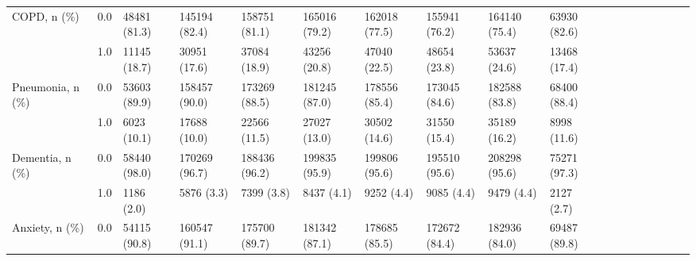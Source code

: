 \begin{tabular}{llllllllllllllllll}
COPD, n (\%) & 0.0 &                 48481 (81.3) &   145194 (82.4) &   158751 (81.1) &   165016 (79.2) &   162018 (77.5) &   155941 (76.2) &   164140 (75.4) &   63930 (82.6) &                   &                    &                    &                    &                    &                     &                     &                     \\
                                       & 1.0 &                 11145 (18.7) &    30951 (17.6) &    37084 (18.9) &    43256 (20.8) &    47040 (22.5) &    48654 (23.8) &    53637 (24.6) &   13468 (17.4) &                   &                    &                    &                    &                    &                     &                     &                     \\
Pneumonia, n (\%) & 0.0 &                 53603 (89.9) &   158457 (90.0) &   173269 (88.5) &   181245 (87.0) &   178556 (85.4) &   173045 (84.6) &   182588 (83.8) &   68400 (88.4) &                   &                    &                    &                    &                    &                     &                     &                     \\
                                       & 1.0 &                  6023 (10.1) &    17688 (10.0) &    22566 (11.5) &    27027 (13.0) &    30502 (14.6) &    31550 (15.4) &    35189 (16.2) &    8998 (11.6) &                   &                    &                    &                    &                    &                     &                     &                     \\
Dementia, n (\%) & 0.0 &                 58440 (98.0) &   170269 (96.7) &   188436 (96.2) &   199835 (95.9) &   199806 (95.6) &   195510 (95.6) &   208298 (95.6) &   75271 (97.3) &                   &                    &                    &                    &                    &                     &                     &                     \\
                                       & 1.0 &                   1186 (2.0) &      5876 (3.3) &      7399 (3.8) &      8437 (4.1) &      9252 (4.4) &      9085 (4.4) &      9479 (4.4) &     2127 (2.7) &                   &                    &                    &                    &                    &                     &                     &                     \\
Anxiety, n (\%) & 0.0 &                 54115 (90.8) &   160547 (91.1) &   175700 (89.7) &   181342 (87.1) &   178685 (85.5) &   172672 (84.4) &   182936 (84.0) &   69487 (89.8) &                   &                    &                    &                    &                    &                     &                     &                     \\

\end{tabular}

